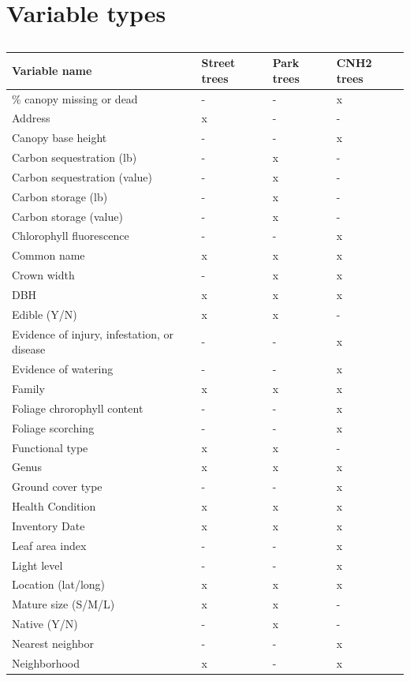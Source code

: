 \documentclass[12pt,twoside]{reedthesis}
\begin{document}
\hypertarget{variable-types}{%
\section{Variable types}\label{variable-types}}
\begin{longtable}[t]{llll}
\caption{\label{tab:var-type-table}}\\
\toprule
Variable name & Street trees & Park trees & CNH2 trees\\
\midrule
\% canopy missing or dead & - & - & x\\
Address & x & - & -\\
Canopy base height & - & - & x\\
Carbon sequestration (lb) & - & x & -\\
Carbon sequestration (value) & - & x & -\\
\addlinespace
Carbon storage (lb) & - & x & -\\
Carbon storage (value) & - & x & -\\
Chlorophyll fluorescence & - & - & x\\
Common name & x & x & x\\
Crown width & - & x & x\\
\addlinespace
DBH & x & x & x\\
Edible (Y/N) & x & x & -\\
Evidence of injury, infestation, or disease & - & - & x\\
Evidence of watering & - & - & x\\
Family & x & x & x\\
\addlinespace
Foliage chrorophyll content & - & - & x\\
Foliage scorching & - & - & x\\
Functional type & x & x & -\\
Genus & x & x & x\\
Ground cover type & - & - & x\\
\addlinespace
Health Condition & x & x & x\\
Inventory Date & x & x & x\\
Leaf area index & - & - & x\\
Light level & - & - & x\\
Location (lat/long) & x & x & x\\
\addlinespace
Mature size (S/M/L) & x & x & -\\
Native (Y/N) & - & x & -\\
Nearest neighbor & - & - & x\\
Neighborhood & x & - & x\\

\end{longtable}
\end{document}
